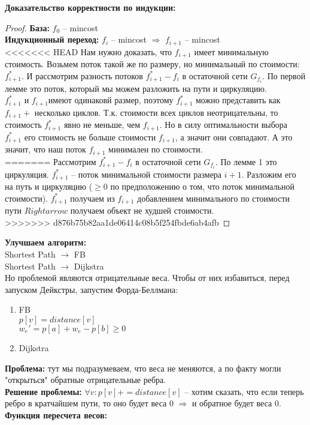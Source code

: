 {\bfseries Доказательство корректности по индукции:}\\
\begin{proof}
{\bfseries База:} $f_0$ -- mincost\\
{\bfseries Индукционный переход:} $f_i$ -- mincost $\Rightarrow$ $f_{i+1}$ -- mincost\\
<<<<<<< HEAD
Нам нужно доказать, что $f_{i+1}$ имеет минимальную стоимость. Возьмем поток такой же по размеру, но минимальный по стоимости: $f^*_{i+1}$. И рассмотрим разность потоков $f^*_{i+1} - f_i$ в остаточной сети $G_{f_i}$. 
По первой лемме это поток, который мы можем разложить на пути и циркуляцию.\\
$f^*_{i+1}$ и $f_{i+1}$имеют одинаковй размер, поэтому $f^*_{i+1}$ можно представить как $f_{i+1} +$ несколько циклов. Т.к. стоимости всех циклов неотрицательны, то стоимость $f^*_{i+1}$ явно не меньше, чем $f_{i+1}$.
Но в силу оптимальности выбора $f^*_{i+1}$ его стоимость не больше стоимости $f_{i+1}$, а значит они совпадают. А это значит, что наш поток $f_{i+1}$ минимален по стоимости.\\
=======
Рассмотрим $f^*_{i+1} - f_i$ в остаточной сети $G_{f_i}$. По лемме 1 это циркуляция. $f^*_{i + 1}$ -- поток минимальной стоимости размера $i + 1$. Разложим его на путь и циркуляцию ($\ge 0$ по предположению о
том, что поток минимальной стоимости). $f^*_{i+1}$ получаем из $f_{i+1}$ добавлением минимального по стоимости пути $Rightarrow$ получаем объект не худшей стоимости.\\
>>>>>>> d876b75b82aa1de06414c08b5f254fbde6ab4afb
\end{proof}
{\bfseries Улучшаем алгоритм:}\\
Shortest Path $\to$ FB \\
Shortest Path $\to$ Dijkstra \\

Но проблемой являются отрицательные веса. Чтобы от них избавиться, перед запуском Дейкстры, запустим Форда-Беллмана:
\begin{enumerate}
	\item FB\\
		 $p[v] = distance[v]$\\
		 $w_e' = p[a] + w_e - p[b] \ge 0$
	\item Dijkstra
\end{enumerate}
{\bfseries Проблема:} тут мы подразумеваем, что веса не меняются, а по факту могли "открыться" обратные отрицательные ребра.\\
{\bfseries Решение проблемы:} $\forall v: p[v] += distance[v]$ -- хотим сказать, что если теперь ребро в кратчайшем пути, то оно будет веса 0 $\Rightarrow$ и обратное будет веса 0.\\
{\bfseries Функция пересчета весов:}
\begin{cppcode}
	Apply(w, p) {
		for w_e = ...    // Пересчитываем вес ребра с учетом потенциалов
	Apply(w, distance)   // Наш потенциал - расстояние
\end{cppcode}

